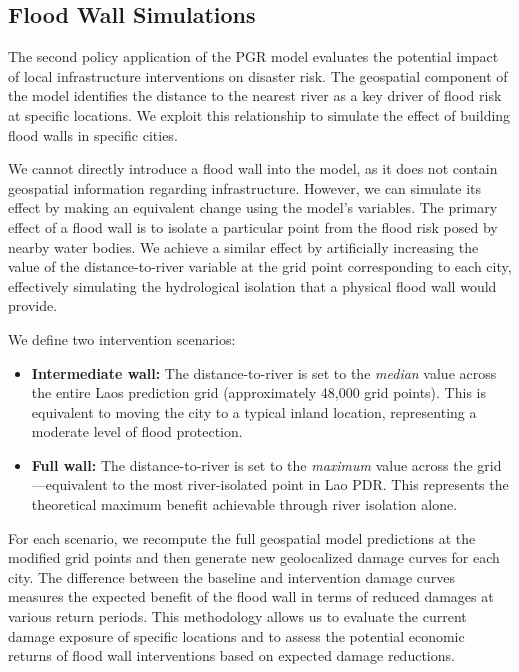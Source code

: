 \documentclass[11pt,a4paper]{article}
\begin{document}
\subsection{Flood Wall Simulations}

The second policy application of the PGR model evaluates the potential impact of local infrastructure interventions on disaster risk. The geospatial component of the model identifies the distance to the nearest river as a key driver of flood risk at specific locations. We exploit this relationship to simulate the effect of building flood walls in specific cities.

We cannot directly introduce a flood wall into the model, as it does not contain geospatial information regarding infrastructure. However, we can simulate its effect by making an equivalent change using the model's variables. The primary effect of a flood wall is to isolate a particular point from the flood risk posed by nearby water bodies. We achieve a similar effect by artificially increasing the value of the distance-to-river variable at the grid point corresponding to each city, effectively simulating the hydrological isolation that a physical flood wall would provide.

We define two intervention scenarios:

\begin{itemize}[leftmargin=2em]
  \item \textbf{Intermediate wall:} The distance-to-river is set to the \textit{median} value across the entire Laos prediction grid (approximately 48,000 grid points). This is equivalent to moving the city to a typical inland location, representing a moderate level of flood protection.
  \item \textbf{Full wall:} The distance-to-river is set to the \textit{maximum} value across the grid---equivalent to the most river-isolated point in Lao PDR. This represents the theoretical maximum benefit achievable through river isolation alone.
\end{itemize}

For each scenario, we recompute the full geospatial model predictions at the modified grid points and then generate new geolocalized damage curves for each city. The difference between the baseline and intervention damage curves measures the expected benefit of the flood wall in terms of reduced damages at various return periods. This methodology allows us to evaluate the current damage exposure of specific locations and to assess the potential economic returns of flood wall interventions based on expected damage reductions.
\end{document}

